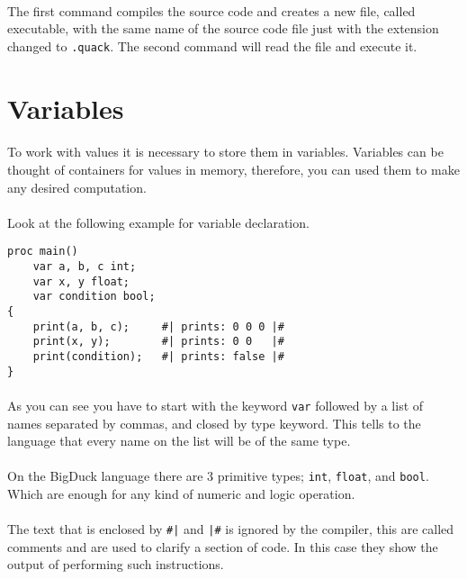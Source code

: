 \paragraph{} The first command compiles the source code and creates a new file,
called executable, with the same name of the source code file just with the
extension changed to \texttt{.quack}. The second command will read the file
and execute it.

\section{Variables}
\paragraph{} To work with values it is necessary to store them in variables.
Variables can be thought of containers for values in memory, therefore, you
can used them to make any desired computation.

\paragraph{} Look at the following example for variable declaration.
\begin{verbatim}
proc main()
    var a, b, c int;
    var x, y float;
    var condition bool;
{
    print(a, b, c);     #| prints: 0 0 0 |#
    print(x, y);        #| prints: 0 0   |#
    print(condition);   #| prints: false |#
}
\end{verbatim}

\paragraph{} As you can see you have to start with the keyword \texttt{var}
followed by a list of names separated by commas, and closed by type keyword.
This tells to the language that every name on the list will be of the same type.

\paragraph{} On the BigDuck language there are 3 primitive types; \texttt{int},
\texttt{float}, and \texttt{bool}. Which are enough for any kind of numeric
and logic operation.

\paragraph{} The text that is enclosed by \texttt{\#|} and \texttt{|\#} is
ignored by the compiler, this are called comments and are used to clarify a
section of code. In this case they show the output of performing such
instructions.


